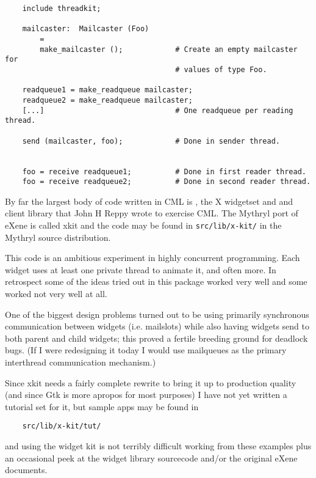 \begin{itemize}
\begin{itemize}
\begin{verbatim}
    include threadkit;

    mailcaster:  Mailcaster (Foo)
        =
        make_mailcaster ();            # Create an empty mailcaster for
                                       # values of type Foo.

    readqueue1 = make_readqueue mailcaster;
    readqueue2 = make_readqueue mailcaster;
    [...]                              # One readqueue per reading thread.

    send (mailcaster, foo);            # Done in sender thread.


    foo = receive readqueue1;          # Done in first reader thread.
    foo = receive readqueue2;          # Done in second reader thread.
\end{verbatim}

\end{itemize}
\end{itemize}


By far the largest body of code written in CML is , 
the X widgetset and and client library that John H Reppy wrote to exercise CML.
The Mythryl port of eXene is called xkit and the code may be found in {\tt src/lib/x-kit/} 
in the Mythryl source distribution.

This code is an ambitious experiment in highly concurrent programming.  Each widget uses 
at least one private thread to animate it, and often more.  In retrospect some of the 
ideas tried out in this package worked very well and some worked not very well at all. 

One of the biggest design problems turned out to be using primarily synchronous communication 
between widgets (i.e. mailslots) while also having widgets send to both parent and child 
widgets;  this proved a fertile breeding ground for deadlock bugs.  (If I were redesigning 
it today I would use mailqueues as the primary interthread communication mechanism.) 

Since xkit needs a fairly complete rewrite to bring it up to production quality 
(and since Gtk is more apropos for most purposes) I have not yet written a tutorial 
set for it, but sample apps may be found in 

\begin{verbatim}
    src/lib/x-kit/tut/
\end{verbatim}

and using the widget kit is not terribly difficult working from these examples plus 
an occasional peek at the widget library sourcecode and/or the original eXene documents. 



